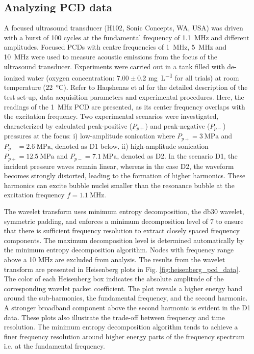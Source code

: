 \documentclass[preprint, linenumbers]{revtex4-2}
\begin{document}
		
\subsection{Analyzing PCD data}
\label{sec:analyzing_PCD_data}
A focused ultrasound transducer (H102, Sonic Concepts, WA, USA) was driven with a burst of 100 cycles at the fundamental frequency of \SI{1.1}{\mega\hertz} and different amplitudes. Focused PCDs with centre frequencies of \SI{1}{\mega\hertz}, \SI{5}{\mega\hertz} and \SI{10}{\mega\hertz} were used to measure acoustic emissions from the focus of the ultrasound transducer. Experiments were carried out in a tank filled with de-ionized water (oxygen concentration: $7.00\pm0.2$ \si{\milli\gram\per\liter} for all trials) at room temperature (\SI{22}{\degreeCelsius}). Refer to Haqshenas et al \cite{haqshenas2015} for the detailed description of the test set-up, data acquisition parameters and experimental procedures. Here, the readings of the \SI{1}{\mega\hertz} PCD are presented, as its center frequency overlaps with the excitation frequency. Two experimental scenarios were investigated, characterized by calculated peak-positive ($P_{p+}$) and peak-negative ($P_{p-}$) pressures at the focus: i) low-amplitude sonication where $P_{p+}=\SI{3}{\mega\pascal}$ and $P_{p-}=\SI{2.6}{\mega\pascal}$, denoted as D1 below, ii) high-amplitude sonication $P_{p+}=\SI{12.5}{\mega\pascal}$ and $P_{p-}=\SI{7.1}{\mega\pascal}$, denoted as D2. In the scenario D1, the incident pressure waves remain linear, whereas in the case D2, the waveform becomes strongly distorted, leading to the formation of higher harmonics. These harmonics can excite bubble nuclei smaller than the resonance bubble at the excitation frequency $f=\SI{1.1}{\mega\hertz}$.
			
The wavelet transform uses minimum entropy decomposition, the db30 wavelet, symmetric padding, and enforces a minimum decomposition level of 7 to ensure that there is sufficient frequency resolution to extract closely spaced frequency components. The maximum decomposition level is determined automatically by the minimum entropy decomposition algorithm. Nodes with frequency range above a 10 MHz are excluded from analysis. The results from the wavelet transform are presented in Heisenberg plots in Fig. \ref{fig:heisenberg_pcd_data}. The color of each Heisenberg box indicates the absolute amplitude of the corresponding wavelet packet coefficient. The plot reveals a higher energy band around the sub-harmonics, the fundamental frequency, and the second harmonic. A stronger broadband component above the second harmonic is evident in the D1 data. These plots also illustrate the trade-off between frequency and time resolution. The minimum entropy decomposition algorithm tends to achieve a finer frequency resolution around higher energy parts of the frequency spectrum i.e. at the fundamental frequency.
			
\end{document}
